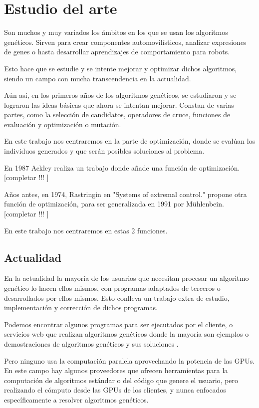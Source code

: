 \chapter{Estudio del arte}
\bigskip

Son muchos y muy variados los ámbitos en los que se usan los algoritmos genéticos. Sirven para crear componentes automovilísticos, analizar expresiones de genes o hasta desarrollar aprendizajes de comportamiento para robots.

Esto hace que se estudie y se intente mejorar y optimizar dichos algoritmos, siendo un campo con mucha transcendencia en la actualidad.

Aún así, en los primeros años de los algoritmos genéticos, se estudiaron y se lograron las ideas básicas que ahora se intentan mejorar. Constan de varias partes, como la selección de candidatos, operadores de cruce, funciones de evaluación y optimización o mutación.

En este trabajo nos centraremos en la parte de optimización, donde se evalúan los individuos generados y que serán posibles soluciones al problema.

En 1987 Ackley realiza un trabajo donde añade una función de optimización.
[completar !!! ]

Años antes, en 1974, Rastringin en "Systems of extremal control." propone otra función de optimización, para ser generalizada en 1991 por Mühlenbein.
[completar !!! ]


En este trabajo nos centraremos en estas 2 funciones.  

\newpage
\section{Actualidad}
\bigskip

En la actualidad la mayoría de los usuarios que necesitan procesar un algoritmo genético lo hacen ellos mismos, con programas adaptados de terceros o desarrollados por ellos mismos. Esto conlleva un trabajo extra de estudio, implementación y corrección de dichos programas. 

Podemos encontrar algunos programas \cite{agpython} \cite{agjava} \cite{agmatlab} para ser ejecutados por el cliente, o servicios web que realizan algoritmos genéticos donde la mayoría son ejemplos o demostraciones de algoritmos genéticos y sus soluciones \cite{agandar} \cite{agcoche}.

Pero ninguno usa la computación paralela aprovechando la potencia de las GPUs. En este campo hay algunos proveedores \cite{cudaimpact} \cite{cudagpuocelot} que ofrecen herramientas para la computación de algoritmos estándar o del código que genere el usuario, pero  realizando el cómputo desde las GPUs de los clientes, y nunca enfocados específicamente a resolver algoritmos genéticos.

